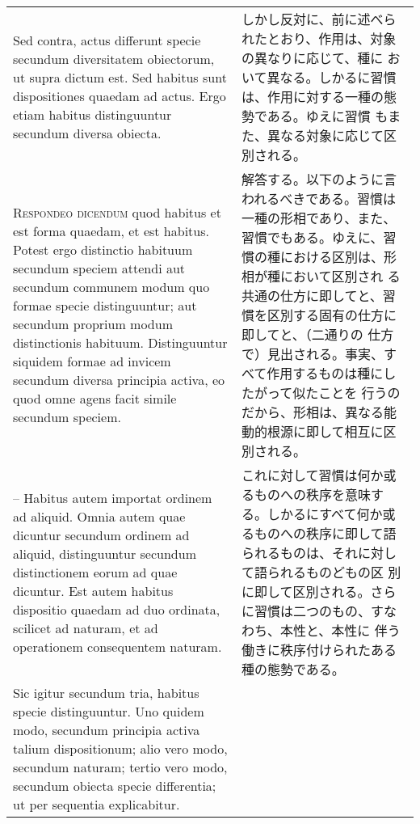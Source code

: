 \documentclass[10pt]{jsarticle} %
\begin{document}
\begin{longtable}{p{21em}p{21em}}
\\



Sed contra, actus differunt specie secundum diversitatem obiectorum,
ut supra dictum est. Sed habitus sunt dispositiones quaedam ad
actus. Ergo etiam habitus distinguuntur secundum diversa obiecta.

&

しかし反対に、前に述べられたとおり、作用は、対象の異なりに応じて、種に
おいて異なる。しかるに習慣は、作用に対する一種の態勢である。ゆえに習慣
もまた、異なる対象に応じて区別される。


\\



{\scshape Respondeo dicendum} quod habitus et est forma quaedam, et
est habitus. Potest ergo distinctio habituum secundum speciem attendi
aut secundum communem modum quo formae specie distinguuntur; aut
secundum proprium modum distinctionis habituum. Distinguuntur siquidem
formae ad invicem secundum diversa principia activa, eo quod omne
agens facit simile secundum speciem.

&

解答する。以下のように言われるべきである。習慣は一種の形相であり、また、
習慣でもある。ゆえに、習慣の種における区別は、形相が種において区別され
る共通の仕方に即してと、習慣を区別する固有の仕方に即してと、（二通りの
仕方で）見出される。事実、すべて作用するものは種にしたがって似たことを
行うのだから、形相は、異なる能動的根源に即して相互に区別される。


\\


-- Habitus autem importat ordinem ad aliquid. Omnia autem quae
   dicuntur secundum ordinem ad aliquid, distinguuntur secundum
   distinctionem eorum ad quae dicuntur. Est autem habitus dispositio
   quaedam ad duo ordinata, scilicet ad naturam, et ad operationem
   consequentem naturam.


&

これに対して習慣は何か或るものへの秩序を意味する。しかるにすべて何か或
るものへの秩序に即して語られるものは、それに対して語られるものどもの区
別に即して区別される。さらに習慣は二つのもの、すなわち、本性と、本性に
伴う働きに秩序付けられたある種の態勢である。


\\

Sic igitur secundum tria, habitus specie distinguuntur. Uno quidem
modo, secundum principia activa talium dispositionum; alio vero modo,
secundum naturam; tertio vero modo, secundum obiecta specie
differentia; ut per sequentia explicabitur.


\end{longtable}
\end{document}
